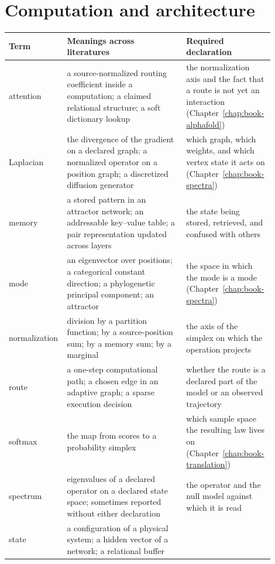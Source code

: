 \section*{Computation and architecture}

\begin{center}
\small
\setlength{\tabcolsep}{4pt}
\begin{tabular}{@{}>{\raggedright\arraybackslash}p{0.14\linewidth}
                >{\raggedright\arraybackslash}p{0.44\linewidth}
                >{\raggedright\arraybackslash}p{0.32\linewidth}@{}}
\toprule
Term & Meanings across literatures & Required declaration \\
\midrule
attention & a source-normalized routing coefficient inside a computation; a claimed relational
structure; a soft dictionary lookup &
the normalization axis and the fact that a route is not yet an interaction
(Chapter~\ref{chap:book-alphafold}) \\
Laplacian & the divergence of the gradient on a declared graph; a normalized operator on a
position graph; a discretized diffusion generator &
which graph, which weights, and which vertex state it acts on
(Chapter~\ref{chap:book-spectra}) \\
memory & a stored pattern in an attractor network; an addressable key--value table; a pair
representation updated across layers &
the state being stored, retrieved, and confused with others \\
mode & an eigenvector over positions; a categorical constant direction; a phylogenetic principal
component; an attractor &
the space in which the mode is a mode (Chapter~\ref{chap:book-spectra}) \\
normalization & division by a partition function; by a source-position sum; by a memory sum; by a
marginal &
the axis of the simplex on which the operation projects \\
route & a one-step computational path; a chosen edge in an adaptive graph; a sparse execution
decision &
whether the route is a declared part of the model or an observed trajectory \\
softmax & the map from scores to a probability simplex &
which sample space the resulting law lives on (Chapter~\ref{chap:book-translation}) \\
spectrum & eigenvalues of a declared operator on a declared state space; sometimes reported
without either declaration &
the operator and the null model against which it is read \\
state & a configuration of a physical system; a hidden vector of a network; a relational buffer

\end{tabular}
\end{center}
